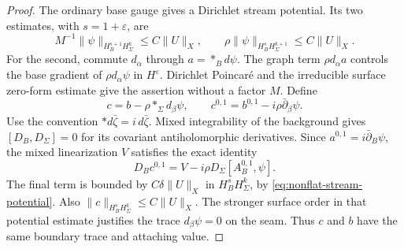 \documentclass[11pt]{amsart}
\theoremstyle{definition}
\theoremstyle{remark}
\theoremstyle{plain}
\begin{document}
\begin{proof}
The ordinary base gauge gives a Dirichlet stream potential.
Its two estimates, with $s=1+\varepsilon$, are
\begin{equation}\label{eq:nonflat-stream-potential}
 M^{-1}\|\psi\|_{H_B^{s+1}H_\Sigma^k}\leq C\|U\|_X,\qquad
 \rho\|\psi\|_{H_B^sH_\Sigma^{k+1}}\leq C\|U\|_X.
\end{equation}
For the second, commute $d_\alpha$ through $a=*_Bd\psi$.
The graph term $\rho d_\alpha a$ controls the base gradient
of $\rho d_\alpha\psi$ in $H^\varepsilon$. Dirichlet
Poincar\'e and the irreducible surface zero-form estimate give
the assertion without a factor $M$. Define
\begin{equation}\label{eq:nonflat-integrability-variable}
 c=b-\rho *_\Sigma d_\beta\psi,\qquad
 c^{0,1}=b^{0,1}-i\rho\bar\partial_\beta\psi.
\end{equation}
Use the convention $*d\bar\zeta=i\,d\bar\zeta$.
Mixed integrability of the background gives
$[D_B,D_\Sigma]=0$ for its covariant antiholomorphic
derivatives. Since $a^{0,1}=i\bar\partial_B\psi$, the mixed
linearization $V$ satisfies the exact identity
\begin{equation}\label{eq:nonflat-stream-integrability}
 D_Bc^{0,1}
                  =V-i\rho D_\Sigma[A_B^{0,1},\psi].
\end{equation}
The final term is bounded by $C\delta\|U\|_X$ in
$H_B^sH_\Sigma^k$, by \eqref{eq:nonflat-stream-potential}.
Also $\|c\|_{H_B^sH_\Sigma^k}\leq C\|U\|_X$.
The stronger surface order in that potential estimate justifies
the trace $d_\beta\psi=0$ on the seam. Thus $c$ and $b$ have
the same boundary trace and attaching value.


\end{proof}
\end{document}
